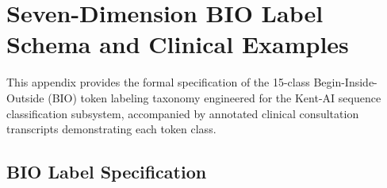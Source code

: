 
\chapter{Seven-Dimension BIO Label Schema and Clinical Examples}
\label{AppendixA}

This appendix provides the formal specification of the 15-class Begin-Inside-Outside (BIO) token labeling taxonomy engineered for the Kent-AI sequence classification subsystem, accompanied by annotated clinical consultation transcripts demonstrating each token class.


\section{BIO Label Specification}

